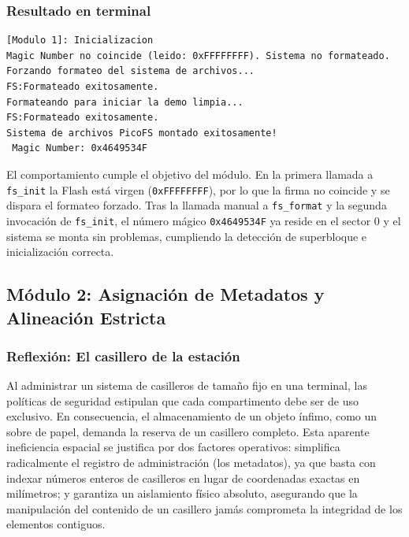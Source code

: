 \documentclass[12pt,letterpaper]{article}
\begin{document}
\bigskip

\subsubsection*{Resultado en terminal}

\begin{Verbatim}[frame=single, fontsize=\footnotesize]
[Modulo 1]: Inicializacion
Magic Number no coincide (leido: 0xFFFFFFFF). Sistema no formateado.
Forzando formateo del sistema de archivos...
FS:Formateado exitosamente.
Formateando para iniciar la demo limpia...
FS:Formateado exitosamente.
Sistema de archivos PicoFS montado exitosamente!
 Magic Number: 0x4649534F
\end{Verbatim}

El comportamiento cumple el objetivo del módulo.
En la primera llamada a \texttt{fs\_init} la Flash está virgen (\texttt{0xFFFFFFFF}),
por lo que la firma no coincide y se dispara el formateo forzado.
Tras la llamada manual a \texttt{fs\_format} y la segunda invocación de \texttt{fs\_init},
el número mágico \texttt{0x4649534F} ya reside en el sector 0 y el sistema se monta
sin problemas, cumpliendo la detección de superbloque e inicialización correcta.

\subsection*{Módulo 2: Asignación de Metadatos y Alineación Estricta}

\subsubsection*{Reflexión: El casillero de la estación}
Al administrar un sistema de casilleros de tamaño fijo en una terminal, las políticas de seguridad estipulan que
cada compartimento debe ser de uso exclusivo. En consecuencia, el almacenamiento de un objeto ínfimo, como un
sobre de papel, demanda la reserva de un casillero completo. Esta aparente ineficiencia espacial se justifica
por dos factores operativos: simplifica radicalmente el registro de administración (los metadatos), ya que basta
con indexar números enteros de casilleros en lugar de coordenadas exactas en milímetros; y garantiza un
aislamiento físico absoluto, asegurando que la manipulación del contenido de un casillero jamás comprometa la
integridad de los elementos contiguos.
\end{document}
